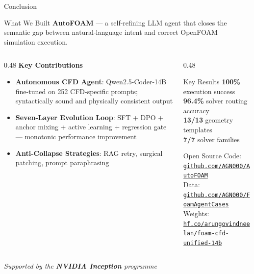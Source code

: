 \documentclass[aspectratio=169,10pt]{beamer}
\begin{document}
\begin{frame}{Conclusion}
  \begin{block}{What We Built}
    \textbf{AutoFOAM} — a self-refining LLM agent that closes the semantic gap between natural-language intent and correct OpenFOAM simulation execution.
  \end{block}
  \vspace{6pt}
  \begin{columns}
    \begin{column}{0.48\textwidth}
      \textbf{Key Contributions}
      \begin{itemize}
        \item \textbf{Autonomous CFD Agent}: Qwen2.5-Coder-14B fine-tuned on 252 CFD-specific prompts; syntactically sound and physically consistent output
        \item \textbf{Seven-Layer Evolution Loop}: SFT + DPO + anchor mixing + active learning + regression gate — monotonic performance improvement
        \item \textbf{Anti-Collapse Strategies}: RAG retry, surgical patching, prompt paraphrasing
      \end{itemize}
    \end{column}
    \begin{column}{0.48\textwidth}
      \begin{exampleblock}{Key Results}
        \centering\large
        \textbf{100\%} execution success\\[4pt]
        \textbf{96.4\%} solver routing accuracy\\[4pt]
        \textbf{13/13} geometry templates\\[4pt]
        \textbf{7/7} solver families
      \end{exampleblock}
      \vspace{4pt}
      \begin{block}{Open Source}
        \scriptsize
        Code: \href{https://github.com/AGN000/AutoFOAM}{\texttt{github.com/AGN000/AutoFOAM}}\\
        Data: \href{https://github.com/AGN000/FoamAgentCases}{\texttt{github.com/AGN000/FoamAgentCases}}\\
        Weights: \href{https://huggingface.co/arungovindneelan/foam-cfd-unified-14b}{\texttt{hf.co/arungovindneelan/foam-cfd-unified-14b}}
      \end{block}
    \end{column}
  \end{columns}
  \vspace{4pt}
  \centering\small\textit{Supported by the \textbf{NVIDIA Inception} programme}
\end{frame}
\end{document}

